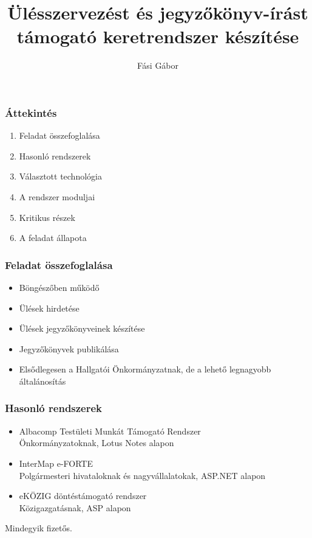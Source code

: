 \documentclass[12pt]{beamer}
\title[Ülésszervezést és jk.-írást támogató kr. készítése\hspace{4em}\insertframenumber/\inserttotalframenumber]{Ülésszervezést és jegyzőkönyv-írást támogató keretrendszer készítése}
\author{Fási Gábor}
\institute{Konzulens: Dulai Tibor}
\date{}
\begin{document}
\frame{\titlepage}

\begin{frame}
    \frametitle{Áttekintés}
    \Large
    \begin{enumerate}
        \item Feladat összefoglalása
        \item Hasonló rendszerek
        \item Választott technológia
        \item A rendszer moduljai
        \item Kritikus részek
        \item A feladat állapota
    \end{enumerate}
\end{frame}

\begin{frame}
    \frametitle{Feladat összefoglalása}
    
    \Large
    \begin{itemize}
	    \item Böngészőben működő
	    \item Ülések hirdetése
	    \item Ülések jegyzőkönyveinek készítése
	    \item Jegyzőkönyvek publikálása
	    \item Elsődlegesen a Hallgatói Önkormányzatnak, de a lehető legnagyobb általánosítás
    \end{itemize}
\end{frame}

\begin{frame}
    \frametitle{Hasonló rendszerek}
    
    \begin{itemize}
        \item \large Albacomp Testületi Munkát Támogató Rendszer\\
            \small{Önkormányzatoknak, Lotus Notes alapon}
            
        \item \large InterMap e-FORTE\\
            \small{Polgármesteri hivataloknak és nagyvállalatokak, ASP.NET alapon}
            
        \item \large eKÖZIG döntéstámogató rendszer\\
            \small{Közigazgatásnak, ASP alapon}
    \end{itemize}
    
    \large Mindegyik fizetős.
\end{frame}
\end{document}
